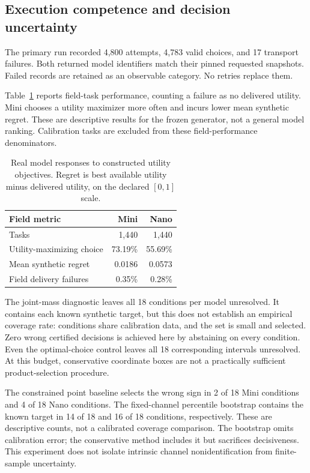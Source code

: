 \subsection{Execution competence and decision uncertainty}
The primary run recorded 4,800 attempts, 4,783 valid choices, and 17 transport failures. Both returned model identifiers match their pinned requested snapshots. Failed records are retained as an observable category. No retries replace them.

Table~\ref{tab:model-performance} reports field-task performance, counting a failure as no delivered utility. Mini chooses a utility maximizer more often and incurs lower mean synthetic regret. These are descriptive results for the frozen generator, not a general model ranking. Calibration tasks are excluded from these field-performance denominators.

\begin{table}[t]
\centering\small
\begin{tabular}{@{}lrr@{}}
\toprule Field metric & Mini & Nano \\\midrule
Tasks & 1,440 & 1,440 \\
Utility-maximizing choice & 73.19\% & 55.69\% \\
Mean synthetic regret & 0.0186 & 0.0573 \\
Field delivery failures & 0.35\% & 0.28\% \\\bottomrule
\end{tabular}
\caption{Real model responses to constructed utility objectives. Regret is best available utility minus delivered utility, on the declared $[0,1]$ scale.}
\label{tab:model-performance}
\end{table}

The joint-mass diagnostic leaves all 18 conditions per model unresolved. It contains each known synthetic target, but this does not establish an empirical coverage rate: conditions share calibration data, and the set is small and selected. Zero wrong certified decisions is achieved here by abstaining on every condition. Even the optimal-choice control leaves all 18 corresponding intervals unresolved. At this budget, conservative coordinate boxes are not a practically sufficient product-selection procedure.

The constrained point baseline selects the wrong sign in 2 of 18 Mini conditions and 4 of 18 Nano conditions. The fixed-channel percentile bootstrap contains the known target in 14 of 18 and 16 of 18 conditions, respectively. These are descriptive counts, not a calibrated coverage comparison. The bootstrap omits calibration error; the conservative method includes it but sacrifices decisiveness. This experiment does not isolate intrinsic channel nonidentification from finite-sample uncertainty.

